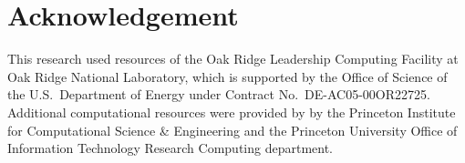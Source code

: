 \section*{Acknowledgement}

This research used resources of the Oak Ridge Leadership Computing Facility at Oak Ridge National Laboratory, which is supported by the Office of Science
of the U.S.\ Department of Energy under Contract No.~DE-AC05-00OR22725.
\\
Additional computational resources were provided by by the Princeton Institute for Computational
Science \& Engineering and the Princeton University Office of Information
Technology Research Computing department.
